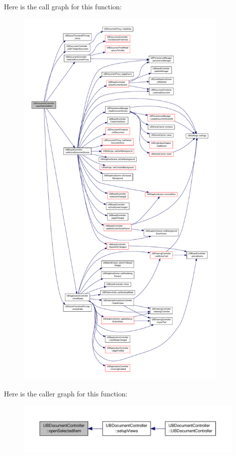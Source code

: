 Here is the call graph for this function\-:
\nopagebreak
\begin{figure}[H]
\begin{center}
\leavevmode
\includegraphics[height=550pt]{d6/de0/class_u_b_document_controller_ae617ef6d5f7b83dd7e121da6fb389799_cgraph}
\end{center}
\end{figure}




Here is the caller graph for this function\-:
\nopagebreak
\begin{figure}[H]
\begin{center}
\leavevmode
\includegraphics[width=350pt]{d6/de0/class_u_b_document_controller_ae617ef6d5f7b83dd7e121da6fb389799_icgraph}
\end{center}
\end{figure}


